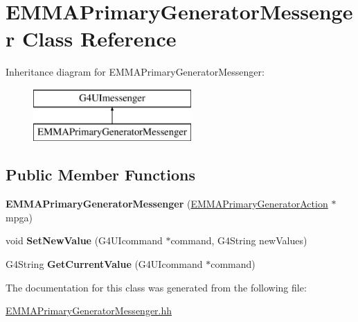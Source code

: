 \hypertarget{classEMMAPrimaryGeneratorMessenger}{\section{E\-M\-M\-A\-Primary\-Generator\-Messenger Class Reference}
\label{classEMMAPrimaryGeneratorMessenger}
}
Inheritance diagram for E\-M\-M\-A\-Primary\-Generator\-Messenger\-:\begin{figure}[H]
\begin{center}
\leavevmode
\includegraphics[height=2.000000cm]{classEMMAPrimaryGeneratorMessenger}
\end{center}
\end{figure}
\subsection*{Public Member Functions}
\begin{DoxyCompactItemize}
\item 
\hypertarget{classEMMAPrimaryGeneratorMessenger_abed200d75bc5bd472e84390abc5cb279}{{\bfseries E\-M\-M\-A\-Primary\-Generator\-Messenger} (\hyperlink{classEMMAPrimaryGeneratorAction}{E\-M\-M\-A\-Primary\-Generator\-Action} $\ast$mpga)}\label{classEMMAPrimaryGeneratorMessenger_abed200d75bc5bd472e84390abc5cb279}

\item 
\hypertarget{classEMMAPrimaryGeneratorMessenger_a22c87322bd1c79f39ec587c1c2225f88}{void {\bfseries Set\-New\-Value} (G4\-U\-Icommand $\ast$command, G4\-String new\-Values)}\label{classEMMAPrimaryGeneratorMessenger_a22c87322bd1c79f39ec587c1c2225f88}

\item 
\hypertarget{classEMMAPrimaryGeneratorMessenger_a5189bc6a40a57cbf130bfcd61fefcd27}{G4\-String {\bfseries Get\-Current\-Value} (G4\-U\-Icommand $\ast$command)}\label{classEMMAPrimaryGeneratorMessenger_a5189bc6a40a57cbf130bfcd61fefcd27}

\end{DoxyCompactItemize}


The documentation for this class was generated from the following file\-:\begin{DoxyCompactItemize}
\item 
\hyperlink{EMMAPrimaryGeneratorMessenger_8hh}{E\-M\-M\-A\-Primary\-Generator\-Messenger.\-hh}\end{DoxyCompactItemize}
